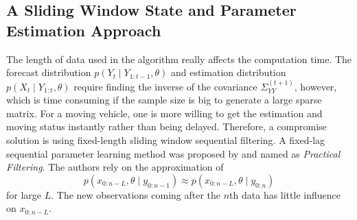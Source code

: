 %

\subsection{A Sliding Window State and Parameter Estimation Approach}

The length of data used in the algorithm really affects the computation time. The forecast distribution $p(Y_{t}\mid Y_{1:t-1},\theta)$ and estimation distribution $p(X_{t}\mid Y_{1:t},\theta)$ require finding the inverse of the covariance $\Sigma_{YY}^{(t+1)}$, however, which is time consuming if the sample size is big to generate a large sparse matrix. For a moving vehicle, one is more willing to get the estimation and moving status instantly rather than being delayed. Therefore, a compromise solution is using fixed-length sliding window sequential filtering. A fixed-lag sequential parameter learning method was proposed by \cite{polson2008practical} and named as \textit{Practical Filtering}. The authors rely on the approximation of 
\begin{equation*}
p(x_{0:n-L},\theta\mid y_{0:n-1}) \approx p(x_{0:n-L},\theta \mid y_{0:n})
\end{equation*}
for large $L$. The new observations coming after the $n$th data has little influence on $x_{0:n-L}$. 

